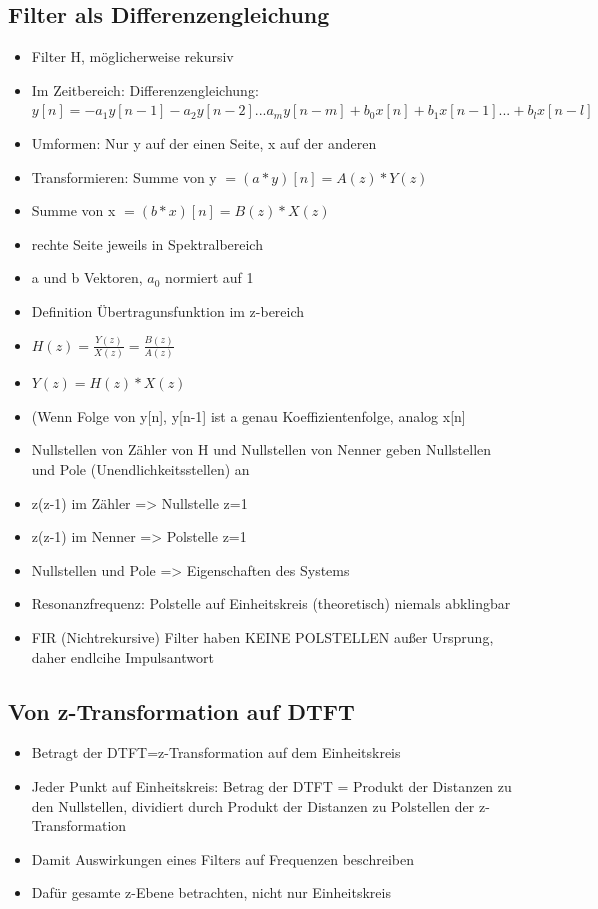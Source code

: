 \documentclass[a4paper,10pt,oneside]{article}
\begin{document}
\subsection{Filter als Differenzengleichung}
\begin{itemize}
	\item Filter H, möglicherweise rekursiv
	\item Im Zeitbereich: Differenzengleichung: $y[n] = -a_1y[n-1] - a_2y[n-2] ...a_my[n-m] + b_0x[n] + b_1x[n-1] ... + b_lx[n-l]$
	\item Umformen: Nur y auf der einen Seite, x auf der anderen
	\item Transformieren: Summe von y $=(a*y)[n] = A(z) * Y(z)$
	\item Summe von x $=(b*x)[n] = B(z) * X(z)$ 
	\item rechte Seite jeweils in Spektralbereich
	\item a und b Vektoren, $a_0$ normiert auf 1
	\item Definition Übertragunsfunktion im z-bereich
	\item $H(z) = \frac{Y(z)}{X(z)} = \frac{B(z)}{A(z)}$
	\item $Y(z) = H(z) * X(z)$
	\item (Wenn Folge von y[n], y[n-1] ist a genau Koeffizientenfolge, analog x[n]
	\item Nullstellen von Zähler von H und Nullstellen von Nenner geben Nullstellen und Pole (Unendlichkeitsstellen) an
	\item z(z-1) im Zähler => Nullstelle z=1
	\item z(z-1) im Nenner => Polstelle z=1
	\item Nullstellen und Pole => Eigenschaften des Systems
	\item Resonanzfrequenz: Polstelle auf Einheitskreis (theoretisch) niemals abklingbar
	\item FIR (Nichtrekursive) Filter haben KEINE POLSTELLEN außer Ursprung, daher endlcihe Impulsantwort
\end{itemize}

\subsection{Von z-Transformation auf DTFT}
\begin{itemize}
	\item Betragt der DTFT=z-Transformation auf dem Einheitskreis
	\item Jeder Punkt auf Einheitskreis: Betrag der DTFT = Produkt der Distanzen zu den Nullstellen, dividiert durch Produkt der Distanzen zu Polstellen der z-Transformation
	\item Damit Auswirkungen eines Filters auf Frequenzen beschreiben
	\item Dafür gesamte z-Ebene betrachten, nicht nur Einheitskreis
\end{itemize}
\end{document}
